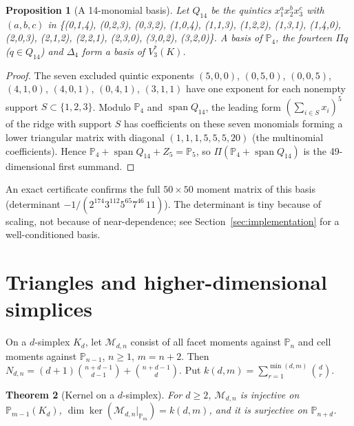 \documentclass[11pt,a4paper]{article}
\newtheorem{theorem}{Theorem}[section]
\newtheorem{proposition}[theorem]{Proposition}
\theoremstyle{definition}
\theoremstyle{remark}
\newcommand{\M}{\mathcal M}
\newcommand{\Pol}{\mathbb P}
\begin{document}
\begin{proposition}[A 14-monomial basis]
\label{prop:fourteen}
Let \(Q_{14}\) be the quintics \(x_1^ax_2^bx_3^c\) with \((a,b,c)\) in
\{(0,1,4), (0,2,3), (0,3,2), (1,0,4), (1,1,3), (1,2,2), (1,3,1),
(1,4,0), (2,0,3), (2,1,2), (2,2,1), (2,3,0), (3,0,2), (3,2,0)\}. A basis of
\(\Pol_4\), the fourteen \(\Pi q\) (\(q\in Q_{14}\)) and \(\Delta_4\) form a
basis of \(V_3^*(K)\).
\end{proposition}

\begin{proof}
The seven excluded quintic exponents \((5,0,0)\), \((0,5,0)\), \((0,0,5)\), \((4,1,0)\),
\((4,0,1)\), \((0,4,1)\), \((3,1,1)\) have one exponent for each nonempty support
\(S\subset\{1,2,3\}\). Modulo \(\Pol_4\) and \(\operatorname{span}Q_{14}\), the
leading form \((\sum_{i\in S}x_i)^5\) of the ridge with support \(S\) has
coefficients on these seven monomials forming a lower triangular matrix with
diagonal \((1,1,1,5,5,5,20)\) (the multinomial coefficients). Hence
\(\Pol_4+\operatorname{span}Q_{14}+Z_5=\Pol_5\), so
\(\Pi(\Pol_4+\operatorname{span}Q_{14})\) is the 49-dimensional first summand.
\end{proof}

An exact certificate confirms the full \(50\times50\) moment matrix of this
basis (determinant \(-1/(2^{174}3^{112}5^{65}7^{46}\,11)\)). The determinant is
tiny because of scaling, not because of near-dependence; see
Section~\ref{sec:implementation} for a well-conditioned basis.

\section{Triangles and higher-dimensional simplices}
\label{sec:dimension}

On a \(d\)-simplex \(K_d\), let \(\M_{d,n}\) consist of all facet moments
against \(\Pol_n\) and cell moments against \(\Pol_{n-1}\), \(n\ge1\), \(m=n+2\).
Then \(N_{d,n}=(d+1)\binom{n+d-1}{d-1}+\binom{n+d-1}{d}\). Put
\(k(d,m)=\sum_{r=1}^{\min(d,m)}\binom dr\).

\begin{theorem}[Kernel on a \(d\)-simplex]
\label{thm:ddim}
For \(d\ge2\), \(\M_{d,n}\) is injective on \(\Pol_{m-1}(K_d)\),
\(\dim\ker(\M_{d,n}|_{\Pol_m})=k(d,m)\), and it is surjective on \(\Pol_{n+d}\).
\end{theorem}
\end{document}
